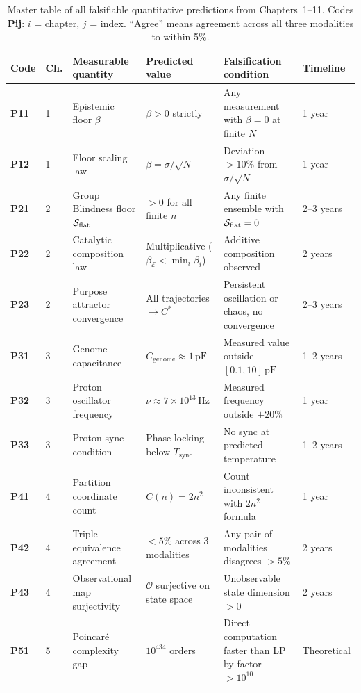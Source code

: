 \begin{table}[!htbp]
\centering
\small
\caption{Master table of all falsifiable quantitative predictions from
Chapters~1--11.  Codes \textbf{Pij}: $i$ = chapter, $j$ = index.
``Agree'' means agreement across all three modalities to within 5\%.}
\label{tab:ch11-all-predictions}
\renewcommand{\arraystretch}{1.15}
\begin{tabular}{@{}p{0.6cm}p{0.6cm}p{3.2cm}p{2.8cm}p{2.4cm}p{1.6cm}@{}}
\toprule
Code & Ch. & Measurable quantity & Predicted value & Falsification condition & Timeline \\
\midrule
\textbf{P11} & 1 & Epistemic floor $\beta$  & $\beta > 0$ strictly & Any measurement with $\beta = 0$ at finite $N$ & 1 year \\
\textbf{P12} & 1 & Floor scaling law & $\beta = \sigma/\sqrt{N}$ & Deviation $> 10\%$ from $\sigma/\sqrt{N}$ & 1 year \\
\textbf{P21} & 2 & Group Blindness floor $\mathcal{S}_{\mathrm{flat}}$ & $> 0$ for all finite $n$ & Any finite ensemble with $\mathcal{S}_{\mathrm{flat}} = 0$ & 2--3 years \\
\textbf{P22} & 2 & Catalytic composition law & Multiplicative ($\beta_{\mathcal{E}} < \min_i \beta_i$) & Additive composition observed & 2 years \\
\textbf{P23} & 2 & Purpose attractor convergence & All trajectories $\to C^*$ & Persistent oscillation or chaos, no convergence & 2--3 years \\
\textbf{P31} & 3 & Genome capacitance & $C_{\mathrm{genome}} \approx 1\,\mathrm{pF}$ & Measured value outside $[0.1, 10]\,\mathrm{pF}$ & 1--2 years \\
\textbf{P32} & 3 & Proton oscillator frequency & $\nu \approx 7\times10^{13}\,\mathrm{Hz}$ & Measured frequency outside $\pm 20\%$ & 1 year \\
\textbf{P33} & 3 & Proton sync condition & Phase-locking below $T_{\mathrm{sync}}$ & No sync at predicted temperature & 1--2 years \\
\textbf{P41} & 4 & Partition coordinate count & $C(n) = 2n^2$ & Count inconsistent with $2n^2$ formula & 1 year \\
\textbf{P42} & 4 & Triple equivalence agreement & $< 5\%$ across 3 modalities & Any pair of modalities disagrees $> 5\%$ & 2 years \\
\textbf{P43} & 4 & Observational map surjectivity & $\mathcal{O}$ surjective on state space & Unobservable state dimension $> 0$ & 2 years \\
\textbf{P51} & 5 & Poincaré complexity gap & $10^{434}$ orders & Direct computation faster than LP by factor $> 10^{10}$ & Theoretical \\

\end{tabular}
\end{table}
